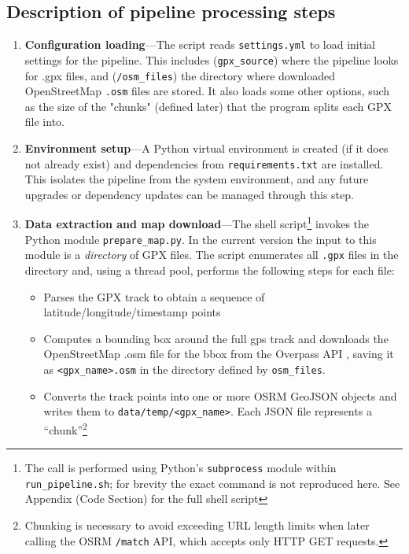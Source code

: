 \documentclass[11pt,a4paper]{article}
\begin{document}
\subsection{Description of pipeline processing steps}
\begin{enumerate}
	\item \textbf{Configuration loading}---The script reads \texttt{settings.yml} to load initial settings for the pipeline.
	      This includes (\texttt{gpx\_source}) where the pipeline looks for .gpx files, and (\texttt{/osm\_files}) the directory where downloaded OpenStreetMap \texttt{.osm} files are stored.
	      It also loads some other options, such as the size of the "chunks" (defined later) that the program splits each GPX file into.
	\item \textbf{Environment setup}---A Python virtual environment is created (if
	      it does not already exist) and dependencies from
	      \texttt{requirements.txt} are installed.  This isolates the pipeline from
	      the system environment, and any future upgrades or dependency updates can be
	      managed through this step.
	\item \textbf{Data extraction and map download}---The shell script\footnote{The call is performed using Python's \texttt{subprocess}
		      module within \texttt{run\_pipeline.sh}; for brevity the exact command is not reproduced here.
		      See Appendix (Code Section) for the full shell script} invokes the Python module \texttt{prepare\_map.py}.
	      In the current version the input to this module is a \emph{directory} of GPX files.  The script enumerates all
	      \texttt{.gpx} files in the directory and, using a thread pool, performs the following steps for each file:
	      \begin{itemize}
		      \item Parses the GPX track to obtain a sequence of latitude/longitude/timestamp points
		      \item Computes a bounding box around the full gps track and downloads the OpenStreetMap .osm file for the bbox from the Overpass API \cite{overpass},
		            saving it as \texttt{\textless gpx\_name\textgreater{}.osm} in the directory defined by \texttt{osm\_files}.
		      \item Converts the track points into one or more OSRM GeoJSON objects and writes them to \texttt{data/temp/\textless gpx\_name\textgreater{}}.
		            Each JSON file represents a ``chunk''\footnote{Chunking is necessary to avoid exceeding URL length limits when later calling the OSRM \texttt{/match} API, which accepts only HTTP GET requests.}

\end{itemize}
\end{enumerate}
\end{document}
